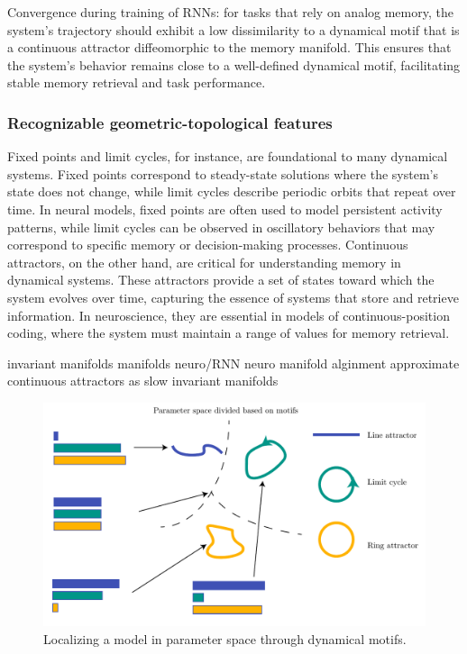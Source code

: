 \documentclass{article}
\theoremstyle{definition} \newtheorem{definition}{Definition}  \newtheorem{example}{Example}
\theoremstyle{remark} \newtheorem{remark}{Remark}
\newcounter{ct}
\begin{document}
Convergence during training of RNNs: for tasks that rely on analog memory, the system's trajectory should exhibit a low dissimilarity to a dynamical motif that is a continuous attractor diffeomorphic to the memory manifold. This ensures that the system's behavior remains close to a well-defined dynamical motif, facilitating stable memory retrieval and task performance.


\subsubsection{Recognizable geometric-topological features}
 Fixed points and limit cycles, for instance, are foundational to many dynamical systems.
Fixed points correspond to steady-state solutions where the system’s state does not change, while limit cycles describe periodic orbits that repeat over time.
 In neural models, fixed points are often used to model persistent activity patterns, while limit cycles can be observed in oscillatory behaviors that may correspond to specific memory or decision-making processes. Continuous attractors, on the other hand, are critical for understanding memory in dynamical systems.
These attractors provide a set of states toward which the system evolves over time, capturing the essence of systems that store and retrieve information.
 In neuroscience, they are essential in models of continuous-position coding, where the system must maintain a range of values for memory retrieval.

invariant manifolds
manifolds neuro/RNN\citep{langdon2023unifying, can2021emergence,cueva2021continuous,gort2024emergence,mishra2021continual,chaudhuri2019attractor, ghazizadeh2021slowmanifold, duncker2021dynamics, pezon2024linking}
neuro \citep{fortunato2024nonlinear}
manifold alginment \citep{kuoch2024probing}
approximate continuous attractors as slow invariant manifolds\citep{Sagodi2024a}

\begin{figure}[htbp]
    \centering
    \includegraphics[width=0.75\linewidth]{parameterspace_motifs}
    \caption{Localizing a model in parameter space through dynamical motifs.}
    \label{fig:ds_landscape}
\end{figure}
\end{document}
